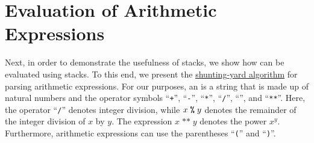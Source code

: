 \section{Evaluation of Arithmetic Expressions}
Next, in order to demonstrate the usefulness of stacks, we show how  can be
evaluated using stacks.  To this end, we present the
\href{https://en.wikipedia.org/wiki/Shunting-yard_algorithm}{shunting-yard algorithm} 
for 
parsing arithmetic expressions.  
For our purposes, an  is a string that is made up of natural numbers and
the operator symbols ``\texttt{+}'', ``\texttt{-}'', ``\texttt{*}'', ``\texttt{/}'',
``\texttt{}'', and ``\texttt{**}''. Here, the operator ``\texttt{/}'' denotes integer division,
while $x \;\texttt{\symbol{37}}\; y$ denotes the remainder of the integer division of $x$ by $y$.  The expression $x\;\texttt{**}\;y$ denotes the power $x^y$.
Furthermore, arithmetic expressions can use the parentheses ``\texttt{(}'' and ``\texttt{)}''.
  
